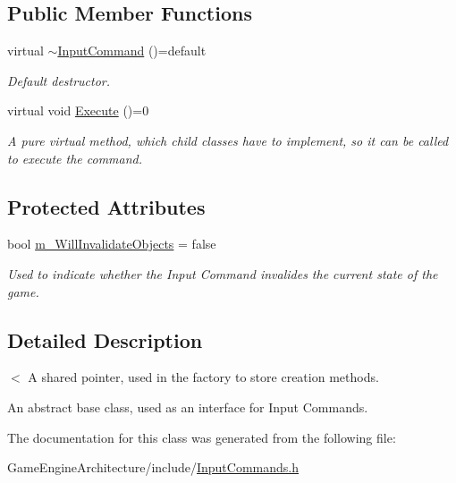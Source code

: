 \subsection*{Public Member Functions}
\begin{DoxyCompactItemize}
\item 
\mbox{\label{class_input_command_a58df7f0cce61472fcfce8f8d52433fb7}} 
virtual \mbox{\hyperlink{class_input_command_a58df7f0cce61472fcfce8f8d52433fb7}{$\sim$\+Input\+Command}} ()=default
\begin{DoxyCompactList}\small\item\em Default destructor. \end{DoxyCompactList}\item 
\mbox{\label{class_input_command_a341ed681b4c3772bef20eb250b8601f2}} 
virtual void \mbox{\hyperlink{class_input_command_a341ed681b4c3772bef20eb250b8601f2}{Execute}} ()=0
\begin{DoxyCompactList}\small\item\em A pure virtual method, which child classes have to implement, so it can be called to execute the command. \end{DoxyCompactList}\end{DoxyCompactItemize}
\subsection*{Protected Attributes}
\begin{DoxyCompactItemize}
\item 
\mbox{\label{class_input_command_aec355997ea200c1e845730a24d054467}} 
bool \mbox{\hyperlink{class_input_command_aec355997ea200c1e845730a24d054467}{m\+\_\+\+Will\+Invalidate\+Objects}} = false
\begin{DoxyCompactList}\small\item\em Used to indicate whether the Input Command invalides the current state of the game. \end{DoxyCompactList}\end{DoxyCompactItemize}


\subsection{Detailed Description}
$<$ A shared pointer, used in the factory to store creation methods. 

An abstract base class, used as an interface for Input Commands. 

The documentation for this class was generated from the following file\+:\begin{DoxyCompactItemize}
\item 
Game\+Engine\+Architecture/include/\mbox{\hyperlink{_input_commands_8h}{Input\+Commands.\+h}}\end{DoxyCompactItemize}
